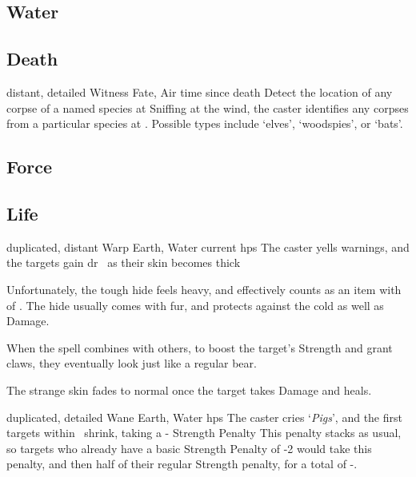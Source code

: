 \begin{multicols}{2}
\subsection{Water}


\subsection{Death}


  {distant, detailed}%
  {Witness}%
  {Fate, Air}%
  {time since death}%
  {Detect the location of any corpse of a named species at \spellRange}%
  {
    Sniffing at the wind, the caster identifies any corpses from a particular species at \spellRange.
    Possible types include `elves', `woodspies', or `bats'.}

\subsection{Force}


\subsection{Life}


  {duplicated, distant}%
  {Warp}%
  {Earth, Water}%
  {current \glspl{hp}}%
  {The caster yells warnings, and the targets gain \gls{dr}~ as their skin becomes thick}%
  {Unfortunately, the tough hide feels heavy, and effectively counts as an item with  of .
  The hide usually comes with fur, and protects against the cold as well as Damage.

  When the spell combines with others, to boost the target's Strength and grant claws, they eventually look just like a regular bear.

  The strange skin fades to normal once the target takes Damage and heals.}

  {duplicated, detailed}%
  {Wane}%
  {Earth, Water}%
  {\glspl{hp}}%
  {The caster cries `\textit{Pigs}', and the first  targets within \spellRange\ shrink, taking a - Strength Penalty}%
  {
  This penalty stacks as usual, so targets who already have a basic Strength Penalty of -2 would take this penalty, and then half of their regular Strength penalty, for a total of -.}


\end{multicols}
